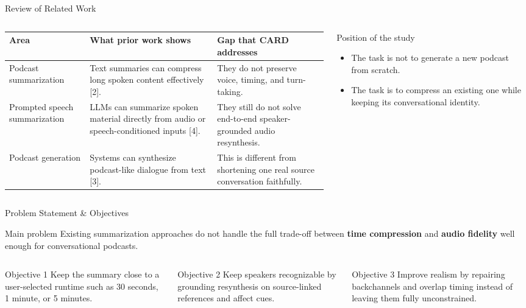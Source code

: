 \documentclass[aspectratio=169,10pt]{beamer}
\newcommand{\framebibtext}{}
\newcommand{\setframebib}[1]{\gdef\framebibtext{#1}}
\newcommand{\refZhengBaseline}{[2] C.~Zheng, H.~J. Wang, K.~Zhang, and L.~Fan, ``A baseline analysis for podcast abstractive summarization,'' arXiv:2008.10648, 2020. [Online]. Available: https://arxiv.org/abs/2008.10648.}
\newcommand{\refPodAgent}{[3] Y.~Xiao, L.~He, H.~Guo, F.-L. Xie, and T.~Lee, ``PodAgent: A comprehensive framework for podcast generation,'' in \emph{Findings of ACL 2025}, 2025, pp.~23923--23937, doi: 10.18653/v1/2025.findings-acl.1226.}
\newcommand{\refAudioPrompt}{[4] W.~Kang and D.~Roy, ``Prompting large language models with audio for general-purpose speech summarization,'' arXiv:2406.05968, 2024. [Online]. Available: https://arxiv.org/abs/2406.05968.}
\begin{document}
\begin{frame}{Review of Related Work}
\setframebib{\refZhengBaseline\\\refPodAgent\\\refAudioPrompt}
\small
\begin{columns}[T,totalwidth=\textwidth]
\begin{tabularx}{\linewidth}{p{2.6cm}YY}
\toprule
Area & What prior work shows & Gap that CARD addresses \\
\midrule
Podcast summarization & Text summaries can compress long spoken content effectively [2]. & They do not preserve voice, timing, and turn-taking. \\
Prompted speech summarization & LLMs can summarize spoken material directly from audio or speech-conditioned inputs [4]. & They still do not solve end-to-end speaker-grounded audio resynthesis. \\
Podcast generation & Systems can synthesize podcast-like dialogue from text [3]. & This is different from shortening one real source conversation faithfully. \\
\bottomrule
\end{tabularx}

\begin{block}{Position of the study}
\begin{itemize}
  \item The task is not to generate a new podcast from scratch.
  \item The task is to compress an existing one while keeping its conversational identity.
\end{itemize}
\end{block}
\end{columns}
\end{frame}

\begin{frame}{Problem Statement \& Objectives}
\setframebib{}
\small
\begin{block}{Main problem}
Existing summarization approaches do not handle the full trade-off between \textbf{time compression} and \textbf{audio fidelity} well enough for conversational podcasts.
\end{block}

\begin{columns}[T,totalwidth=.96\textwidth]
\begin{block}{Objective 1}
Keep the summary close to a user-selected runtime such as 30 seconds, 1 minute, or 5 minutes.
\end{block}

\begin{block}{Objective 2}
Keep speakers recognizable by grounding resynthesis on source-linked references and affect cues.
\end{block}

\begin{block}{Objective 3}
Improve realism by repairing backchannels and overlap timing instead of leaving them fully unconstrained.
\end{block}
\end{columns}
\end{frame}
\end{document}

